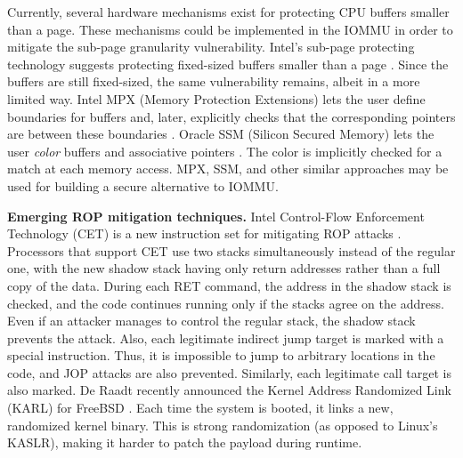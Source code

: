 Currently, several hardware mechanisms exist for protecting CPU buffers smaller than a page. These mechanisms could be implemented in the IOMMU in order to mitigate the sub-page granularity vulnerability. Intel’s sub-page protecting technology suggests protecting fixed-sized buffers smaller than a page \cite{Int18}. Since the buffers are still fixed-sized, the same vulnerability remains, albeit in a more limited way. Intel MPX (Memory Protection Extensions) lets the user define boundaries for buffers and, later, explicitly checks that the corresponding pointers are between these boundaries \cite{Int16a}. Oracle SSM (Silicon Secured Memory) lets the user \emph{color} buffers and associative pointers \cite{Ora15}. The color is implicitly checked for a match at each memory access. MPX, SSM, and other similar approaches may be used for building a secure alternative to IOMMU. 

\smallskip
\noindent\textbf{Emerging ROP mitigation techniques.}
Intel Control-Flow Enforcement Technology (CET) is a new instruction set for mitigating ROP attacks \cite{Int17}. Processors that support CET use two stacks simultaneously instead of the regular one, with the new shadow stack having only return addresses rather than a full copy of the data. During each RET command, the address in the shadow stack is checked, and the code continues running only if the stacks agree on the address. Even if an attacker manages to control the regular stack, the shadow stack prevents the attack. Also, each legitimate indirect jump target is marked with a special instruction. Thus, it is impossible to jump to arbitrary locations in the code, and JOP attacks are also prevented. Similarly, each legitimate call target is also marked. De Raadt recently announced the Kernel Address Randomized Link (KARL) for FreeBSD \cite{dr17}. Each time the system is booted, it links a new, randomized kernel binary. This is strong randomization (as opposed to Linux’s KASLR), making it harder to patch the payload during runtime. 

